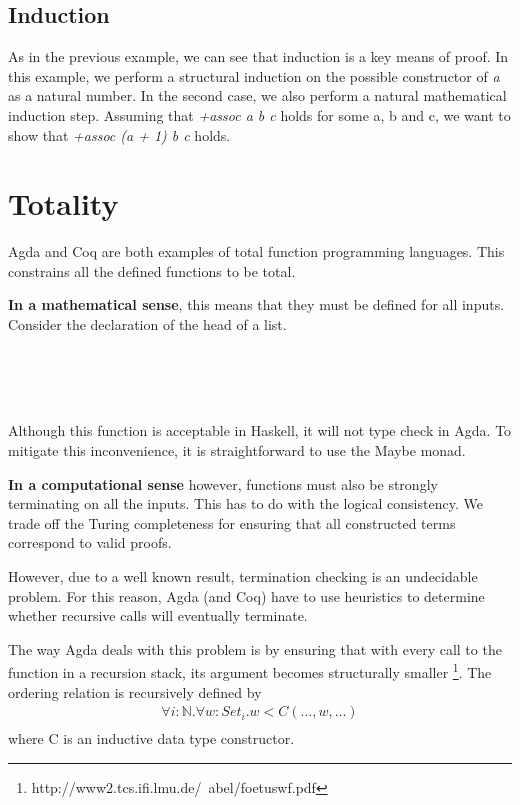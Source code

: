 \documentclass[12pt,twoside,notitlepage]{report}
\begin{document}
\subsection{Induction}

As in the previous example, we can see that induction is a key means of proof. In this example, we perform a structural induction on the possible constructor of \textit{a} as a natural number. In the second case, we also perform a natural mathematical induction step. Assuming that \textit{+assoc a b c} holds for some a, b and c, we want to show that \textit{+assoc (a + 1) b c} holds.

\section{Totality}

Agda and Coq are both examples of total function programming languages. This constrains all the defined functions to be total. 


\textbf{In a mathematical sense}, this means that they must be defined for all inputs. Consider the declaration of the head of a list.

\begin{code}
\\
\> \AgdaSymbol{:}  \AgdaSymbol{\{}\AgdaSymbol{\}}     \<%
\\
\> \AgdaSymbol{(}  \AgdaSymbol{)} \AgdaSymbol{=} \<%
\\
\end{code}

Although this function is acceptable in Haskell, it will not type check in Agda. To mitigate this inconvenience, it is straightforward to use the Maybe monad.

\textbf{In a computational sense} however, functions must also be strongly terminating on all the inputs. This has to do with the logical consistency. We trade off the Turing completeness for ensuring that all constructed terms correspond to valid proofs.

However, due to a well known result, termination checking is an undecidable problem. For this reason, Agda (and Coq) have to use heuristics to determine whether recursive calls will eventually terminate.

The way Agda deals with this problem is by ensuring that with every call to the function in a recursion stack, its argument becomes structurally smaller \cite{str_smaller} \footnote{http://www2.tcs.ifi.lmu.de/~abel/foetuswf.pdf}. The ordering relation is recursively defined by \begin{align*}
\forall i : \mathbb{N}.\forall w : Set_i. w < C(...,w,...)\\
\end{align*}
where C is an inductive data type constructor.
\end{document}
